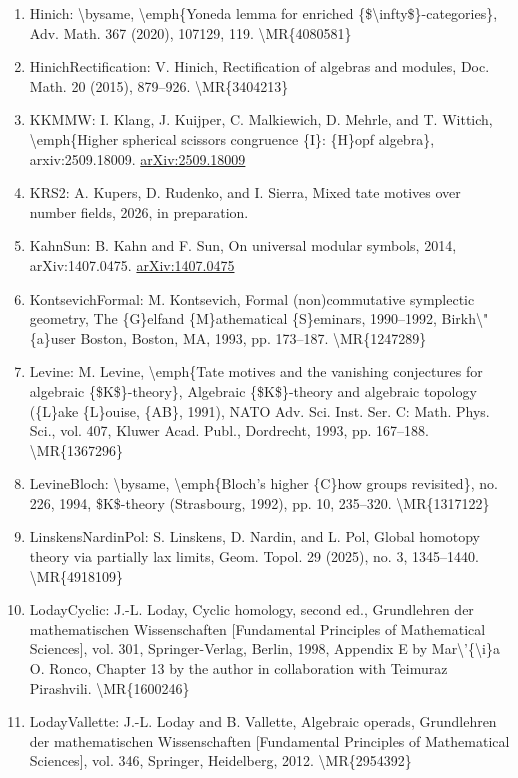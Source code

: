 \documentclass[11pt]{article}
\begin{document}
\begin{enumerate}[leftmargin=*]
  \item Hinich: \textbackslash{}bysame, \textbackslash{}emph\{Yoneda lemma for enriched \{\$\textbackslash{}infty\$\}-categories\}, Adv. Math. 367 (2020), 107129, 119. \textbackslash{}MR\{4080581\}
  \item HinichRectification: V. Hinich, Rectification of algebras and modules, Doc. Math. 20 (2015), 879--926. \textbackslash{}MR\{3404213\}
  \item KKMMW: I. Klang, J. Kuijper, C. Malkiewich, D. Mehrle, and T. Wittich, \textbackslash{}emph\{Higher spherical scissors congruence \{I\}: \{H\}opf algebra\}, arxiv:2509.18009. \href{https://arxiv.org/abs/2509.18009}{arXiv:2509.18009}
  \item KRS2: A. Kupers, D. Rudenko, and I. Sierra, Mixed tate motives over number fields, 2026, in preparation.
  \item KahnSun: B. Kahn and F. Sun, On universal modular symbols, 2014, arXiv:1407.0475. \href{https://arxiv.org/abs/1407.0475}{arXiv:1407.0475}
  \item KontsevichFormal: M. Kontsevich, Formal (non)commutative symplectic geometry, The \{G\}elfand \{M\}athematical \{S\}eminars, 1990--1992, Birkh\textbackslash{}"\{a\}user Boston, Boston, MA, 1993, pp. 173--187. \textbackslash{}MR\{1247289\}
  \item Levine: M. Levine, \textbackslash{}emph\{Tate motives and the vanishing conjectures for algebraic \{\$K\$\}-theory\}, Algebraic \{\$K\$\}-theory and algebraic topology (\{L\}ake \{L\}ouise, \{AB\}, 1991), NATO Adv. Sci. Inst. Ser. C: Math. Phys. Sci., vol. 407, Kluwer Acad. Publ., Dordrecht, 1993, pp. 167--188. \textbackslash{}MR\{1367296\}
  \item LevineBloch: \textbackslash{}bysame, \textbackslash{}emph\{Bloch's higher \{C\}how groups revisited\}, no. 226, 1994, \$K\$-theory (Strasbourg, 1992), pp. 10, 235--320. \textbackslash{}MR\{1317122\}
  \item LinskensNardinPol: S. Linskens, D. Nardin, and L. Pol, Global homotopy theory via partially lax limits, Geom. Topol. 29 (2025), no. 3, 1345--1440. \textbackslash{}MR\{4918109\}
  \item LodayCyclic: J.-L. Loday, Cyclic homology, second ed., Grundlehren der mathematischen Wissenschaften [Fundamental Principles of Mathematical Sciences], vol. 301, Springer-Verlag, Berlin, 1998, Appendix E by Mar\textbackslash{}'\{\textbackslash{}i\}a O. Ronco, Chapter 13 by the author in collaboration with Teimuraz Pirashvili. \textbackslash{}MR\{1600246\}
  \item LodayVallette: J.-L. Loday and B. Vallette, Algebraic operads, Grundlehren der mathematischen Wissenschaften [Fundamental Principles of Mathematical Sciences], vol. 346, Springer, Heidelberg, 2012. \textbackslash{}MR\{2954392\}

\end{enumerate}
\end{document}
